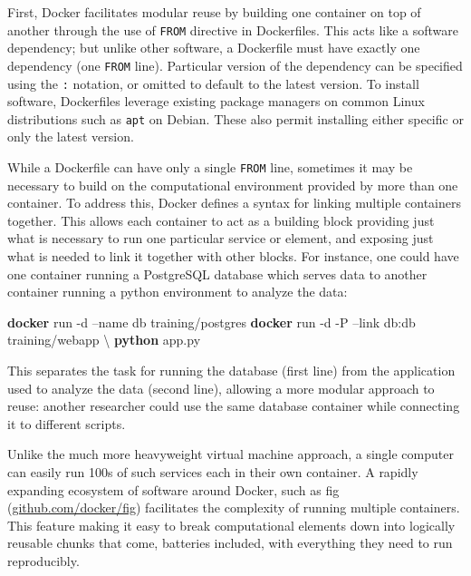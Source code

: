 \documentclass[9pt]{components/acm_proc_article-sp}
\newenvironment{Shaded}{\begin{snugshade}}{\end{snugshade}}
\newcommand{\KeywordTok}[1]{\textcolor[rgb]{0.13,0.29,0.53}{\textbf{{#1}}}}
\newcommand{\NormalTok}[1]{{#1}}
\begin{document}
First, Docker facilitates modular reuse by building one container on top
of another through the use of \texttt{FROM} directive in Dockerfiles.
This acts like a software dependency; but unlike other software, a
Dockerfile must have exactly one dependency (one \texttt{FROM} line).
Particular version of the dependency can be specified using the
\texttt{:} notation, or omitted to default to the latest version. To
install software, Dockerfiles leverage existing package managers on
common Linux distributions such as \texttt{apt} on Debian. These also
permit installing either specific or only the latest version.

While a Dockerfile can have only a single \texttt{FROM} line, sometimes
it may be necessary to build on the computational environment provided
by more than one container. To address this, Docker defines a syntax for
linking multiple containers together. This allows each container to act
as a building block providing just what is necessary to run one
particular service or element, and exposing just what is needed to link
it together with other blocks. For instance, one could have one
container running a PostgreSQL database which serves data to another
container running a python environment to analyze the data:

\begin{Shaded}
\begin{Highlighting}[]
\KeywordTok{docker} \NormalTok{run -d --name db training/postgres}
\KeywordTok{docker} \NormalTok{run -d -P --link db:db training/webapp \textbackslash{}}
  \KeywordTok{python} \NormalTok{app.py}
\end{Highlighting}
\end{Shaded}

This separates the task for running the database (first line) from the
application used to analyze the data (second line), allowing a more
modular approach to reuse: another researcher could use the same
database container while connecting it to different scripts.

Unlike the much more heavyweight virtual machine approach, a single
computer can easily run 100s of such services each in their own
container. A rapidly expanding ecosystem of software around Docker, such
as fig (\href{https://github.com/docker/fig}{github.com/docker/fig})
facilitates the complexity of running multiple containers. This feature
making it easy to break computational elements down into logically
reusable chunks that come, batteries included, with everything they need
to run reproducibly.
\end{document}
